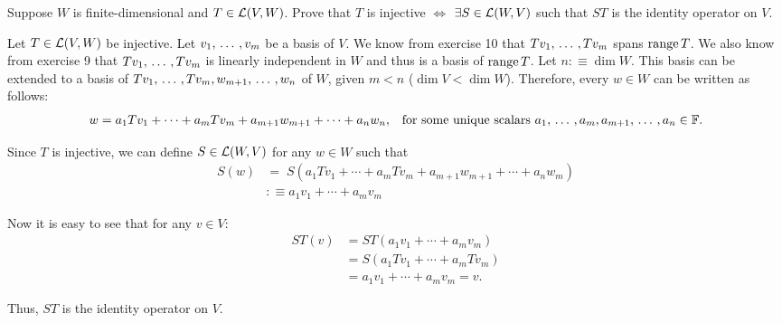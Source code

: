 \begin{xrcs}
  Suppose $W$ is finite-dimensional and $T\in \mathcal{L}(V,W)$. Prove that $T$ is injective $\iff$ $\exists S \in \mathcal{L}(W,V)$ such that $ST$ is the identity operator on $V$.

  \begin{prf}
    \Rightarrowdirection Let $T \in \mathcal{L} (V,W)$ be injective. Let $v_1, {\, \ldots \,\,}, v_m$ be a basis of $V$. We know from exercise 10 that $T v_1, {\, \ldots \,\,}, Tv_m$ spans $\operatorname{range} T$. We also know from exercise 9 that $T v_1, {\, \ldots \,\,}, Tv_m$ is linearly independent in $W$ and thus is a basis of $\operatorname{range} T$. Let $n :\equiv \dim W$. This basis can be extended to a basis of $T v_1, {\, \ldots \,\,}, Tv_m, w_{m+1}, {\, \ldots \,\,}, w_n$ of $W$, given $m < n$ ($\dim V < \dim W$). Therefore, every $w \in W$ can be written as follows:
    \begin{equation}
      w = a_1 T v_1 + \cdots + a_m T v_m + a_{m+1} w_{m+1} + \cdots + a_{n} w_n,
      \quad
      $for some unique scalars $ a_1, \ddd, a_m, a_{m+1}, \ddd, a_n \in \myF.
    \end{equation}

    Since $T$ is injective, we can define $S \in \mathcal{L} (W,V)$ for any $w \in W$ such that
    \begin{equation}
      \begin{aligned}
        S(w) &= \;  S(a_1 T v_1 + \cdots + a_m T v_m + a_{m+1} w_{m+1} + \cdots + a_{n} w_m)  \\
        &:\equiv a_1 v_1 + \cdots + a_m v_m
      \end{aligned}
    \end{equation}

    Now it is easy to see that for any $v \in V$:
    \begin{equation}
      \begin{aligned}
        ST(v) &= ST(a_1 v_1 + \cdots + a_m v_m) \\
        &= S(a_1 T v_1 + \cdots + a_m T v_m) \\
        &= a_1 v_1 + \cdots + a_m v_m = v.
      \end{aligned}
    \end{equation}

    Thus, $ST$ is the identity operator on $V$.


\end{prf}
\end{xrcs}
